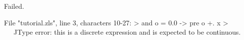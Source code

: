 \runverbatimfalse
{}
\begin{RunVerbatimMsg}
Failed.
\end{RunVerbatimMsg}
\begin{RunVerbatimErr}
File "tutorial.zls", line 3, characters 10-27:
>  and o = 0.0 -> pre o +. x
>          ^^^^^^^^^^^^^^^^^
Type error: this is a discrete expression and is expected to be continuous.
\end{RunVerbatimErr}
